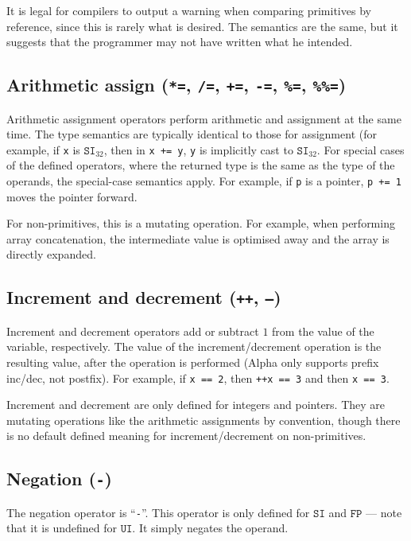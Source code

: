 \documentclass{article}
\newcommand{\R}[1]{\mathtt{#1}}
\begin{document}
It is legal for compilers to output a warning when comparing primitives
by reference, since this is rarely what is desired. The semantics are the
same, but it suggests that the programmer may not have written what he
intended.

\subsection{Arithmetic assign (\texttt{*=}, \texttt{/=}, \texttt{+=},
  \texttt{-=}, \texttt{\%=}, \texttt{\%\%=})}
\label{sub:operators:arithas}
Arithmetic assignment operators perform arithmetic and assignment at the same
time. The type semantics are typically identical to those for assignment
(for example, if \texttt{x} is $\R{SI}_{32}$, then in
\texttt{x~+=~y}, \texttt{y} is implicitly cast to $\R{SI}_{32}$. For special
cases of the defined operators, where the returned type is the same as the
type of the operands, the special-case semantics apply. For example, if
\texttt{p} is a pointer, \texttt{p~+=~1} moves the pointer forward.

For non-primitives, this is a mutating operation. For example, when performing
array concatenation, the intermediate value is optimised away and the
array is directly expanded.

\subsection {Increment and decrement (\texttt{++}, \texttt{--})}
\label{sub:operators:incdec}
Increment and decrement operators add or subtract $1$ from the value of the
variable, respectively. The value of the increment/decrement operation is the
resulting value, after the operation is performed (Alpha only supports prefix
inc/dec, not postfix). For example, if \texttt{x~==~2}, then
\texttt{++x~==~3} and then \texttt{x~==~3}.

Increment and decrement are only defined for integers and pointers. They are
mutating operations like the arithmetic assignments by convention, though there
is no default defined meaning for increment/decrement on non-primitives.

\subsection{Negation (\texttt{-})}
\label{sub:operators:neg}
The negation operator is ``\texttt{-}''. This operator is only defined for
$\R{SI}$ and $\R{FP}$ --- note that it is undefined for $\R{UI}$. It simply
negates the operand.
\end{document}
